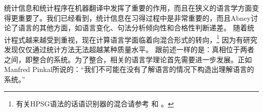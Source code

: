 统计信息和统计程序在机器翻译中发挥了重要的作用，而且在狭义的语言学方面变得更重要了\citep{Abney96a}。我们已经看到，统计信息在习得过程中是非常重要的，而且Abney讨论了语言的其他方面，如语言变化、句法分析倾向性和合格性判断递差。
随着统计程式越来越受到重视，现在计算语言学面临着向混合形式的转向，\footnote{%
有关HPSG语法的话语识别器的混合请参考 和 。
}
因为有研究发现仅仅通过统计方法无法超越某种质量水平\citep{Steedman2011a,Church2011a,Kay2011a}。
跟前述一样的是：真相位于两者之间，即整合的系统。为了整合，相关的语言学理论首先需要进一步发展。正如Manfred Pinkal所说的：“我们不可能在没有了解语言的情况下构造出理解语言的系统。”


